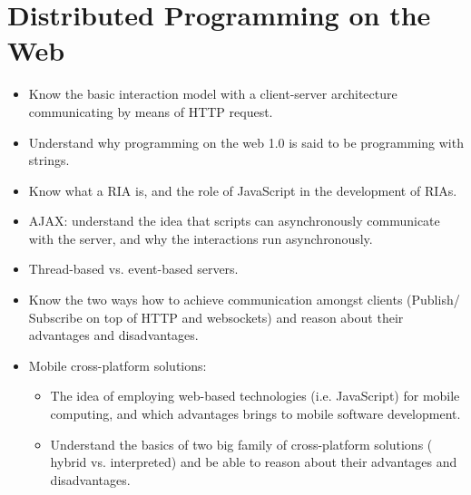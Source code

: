 \documentclass[a4paper]{report}
\begin{document}
\chapter{Distributed Programming on the Web}
\begin{itemize}
  \item Know the basic interaction model with a client-server architecture communicating by
  means of HTTP request.
  \item Understand why programming on the web 1.0 is said to be programming with strings.
  \item Know what a RIA is, and the role of JavaScript in the development of RIAs.
  \item AJAX: understand the idea that scripts can asynchronously communicate with the
  server, and why the interactions run asynchronously.
  \item Thread-based vs. event-based servers.
  \item Know the two ways how to achieve communication amongst clients (Publish/
  Subscribe on top of HTTP and websockets) and reason about their advantages and
  disadvantages.
  \item Mobile cross-platform solutions:
  \begin{itemize}
    \item The idea of employing web-based technologies (i.e. JavaScript) for mobile
    computing, and which advantages brings to mobile software development.
    \item Understand the basics of two big family of cross-platform solutions ( hybrid vs.
    interpreted) and be able to reason about their advantages and disadvantages.
  \end{itemize}
\end{itemize}
\end{document}
